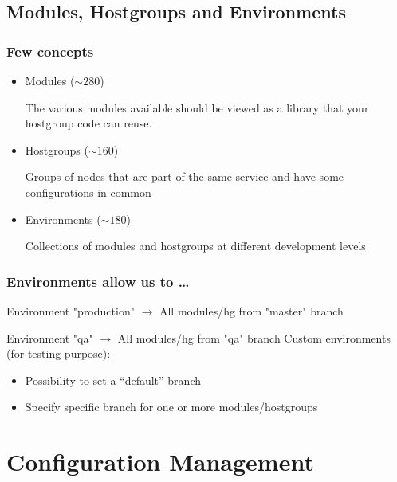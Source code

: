 \documentclass[aspectratio=169]{beamer}
\begin{document}
\subsection{Modules, Hostgroups and Environments}
\begin{frame}
    
    \frametitle{Few concepts}
    \begin{itemize}
        \item Modules ($\sim 280$)

        The various modules available should be viewed as a library that your hostgroup code can reuse.
        \newline
        \item Hostgroups ($\sim 160$)

        Groups of nodes that are part of the same service and have some configurations in common
        \newline
        \item Environments ($\sim 180$)

        Collections of modules and hostgroups at different development levels
    \end{itemize}

\end{frame}


\begin{frame}

    \frametitle{Environments allow us to \ldots}

    Environment "production"
        $\rightarrow$ All modules/hg from "master" branch

    Environment "qa"
        $\rightarrow$ All modules/hg from "qa" branch
    \newline 
    \newline 
    Custom environments (for testing purpose):
    \begin{itemize}
        \item Possibility to set a “default” branch
        \item Specify specific branch for one or more modules/hostgroups
    \end{itemize}

\end{frame}

\section{Configuration Management}
\end{document}
